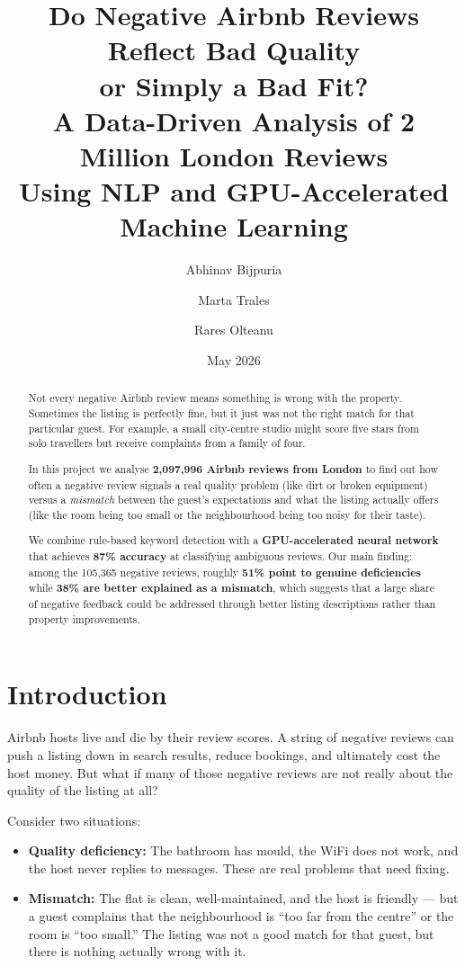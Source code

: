 \documentclass[12pt,a4paper]{article}
\title{\LARGE\textbf{Do Negative Airbnb Reviews Reflect Bad Quality\\or Simply a Bad Fit?}\\[0.5em]
\large A Data-Driven Analysis of 2 Million London Reviews\\Using NLP and GPU-Accelerated Machine Learning}
\author{Abhinav Bijpuria \and Marta Trales \and Rares Olteanu}
\date{May 2026}
\begin{document}
\maketitle

\begin{abstract}
Not every negative Airbnb review means something is wrong with the property.
Sometimes the listing is perfectly fine, but it just was not the right match for that particular guest.
For example, a small city-centre studio might score five stars from solo travellers but receive complaints from a family of four.

In this project we analyse \textbf{2,097,996 Airbnb reviews from London} to find out how often a negative review signals a real quality problem (like dirt or broken equipment) versus a \emph{mismatch} between the guest's expectations and what the listing actually offers (like the room being too small or the neighbourhood being too noisy for their taste).

We combine rule-based keyword detection with a \textbf{GPU-accelerated neural network} that achieves \textbf{87\% accuracy} at classifying ambiguous reviews.
Our main finding: among the 105,365 negative reviews, roughly \textbf{51\% point to genuine deficiencies} while \textbf{38\% are better explained as a mismatch}, which suggests that a large share of negative feedback could be addressed through better listing descriptions rather than property improvements.
\end{abstract}

\section{Introduction}

Airbnb hosts live and die by their review scores.
A string of negative reviews can push a listing down in search results, reduce bookings, and ultimately cost the host money.
But what if many of those negative reviews are not really about the quality of the listing at all?

Consider two situations:
\begin{itemize}[nosep]
    \item \textbf{Quality deficiency:} The bathroom has mould, the WiFi does not work, and the host never replies to messages. These are real problems that need fixing.
    \item \textbf{Mismatch:} The flat is clean, well-maintained, and the host is friendly --- but a guest complains that the neighbourhood is ``too far from the centre'' or the room is ``too small.'' The listing was not a good match for that guest, but there is nothing actually wrong with it.
\end{itemize}
\end{document}
